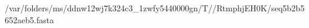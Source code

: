 \documentclass[10pt]{article}
\begin{document}
\begin{texshade}{/var/folders/ms/ddnw12wj7k324c3_1zwfy5440000gn/T//RtmphjEH0K/seq5b2b5652aeb5.fasta}
\hidelogoscale
\hidenames
{}
\showlegend
\end{texshade}
\end{document}
